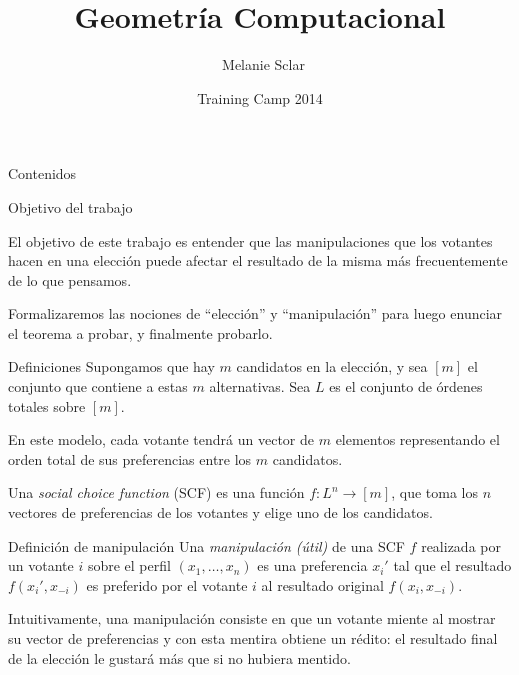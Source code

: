 \documentclass[compress]{beamer}
\title[Geometr\'ia Computacional] %
{Geometr\'ia Computacional}
\author[Melanie Sclar] %
{~Melanie Sclar}
\institute[UBA] %
{
  Facultad de Ciencias Exactas y Naturales\\
  Universidad de Buenos Aires
}
\date[TC 2014] %
{Training Camp 2014}
\begin{document}
\begin{frame}
  \titlepage
\end{frame}

\begin{frame}{Contenidos}
  \tableofcontents
\end{frame}

\begin{frame}{Objetivo del trabajo}

El objetivo de este trabajo es entender que las manipulaciones que los
votantes hacen en una elección puede afectar el resultado de la misma
más frecuentemente de lo que pensamos.\\
\bigskip

Formalizaremos las nociones de ``elección'' y ``manipulación'' para luego
enunciar el teorema a probar, y finalmente probarlo.

\end{frame}

\begin{frame}{Definiciones}
Supongamos que hay $m$ candidatos en la elección, y sea $[m]$ el conjunto
que contiene a estas $m$ alternativas. Sea $L$ es el conjunto de órdenes totales sobre $[m]$.\\
\bigskip

En este modelo, cada votante tendrá un vector de $m$ elementos representando
el orden total de sus preferencias entre los $m$ candidatos.\\
\bigskip

Una \textit{social choice function} (SCF) es una función $f : L^n \rightarrow [m]$,
que toma los $n$ vectores de preferencias de los votantes y elige uno de
los candidatos.

\end{frame}

\begin{frame}

\begin{block}{Definición de manipulación}
Una \textit{manipulación (útil)} de una SCF $f$ realizada por un
votante $i$ sobre el perfil $(x_1, \ldots, x_n)$ es una preferencia $x_i'$ 
tal que el resultado $f(x_i', x_{-i})$ es preferido por el votante $i$
al resultado original $f(x_i,x_{-i})$.
\end{block}
\bigskip

Intuitivamente, una manipulación consiste en que un votante miente al
mostrar su vector de preferencias y con esta mentira obtiene un rédito:
el resultado final de la elección le gustará más que si no hubiera mentido.

\end{frame}
\end{document}
